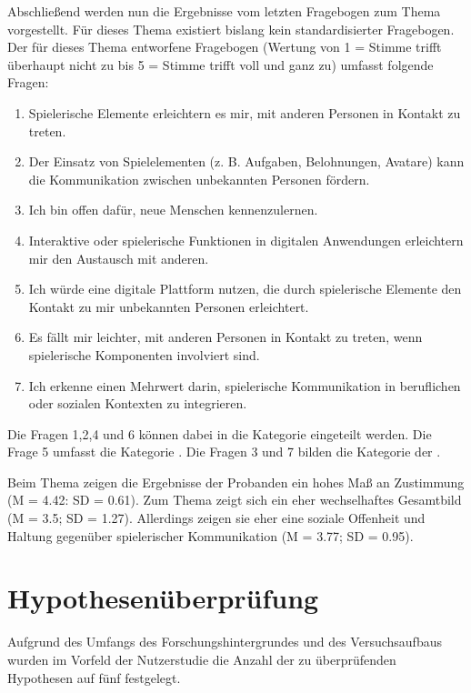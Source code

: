 Abschließend werden nun die Ergebnisse vom letzten Fragebogen zum Thema  vorgestellt. Für dieses Thema existiert bislang kein standardisierter Fragebogen. Der für dieses Thema entworfene Fragebogen (Wertung von 1 = Stimme trifft überhaupt nicht zu bis 5 = Stimme trifft voll und ganz zu) umfasst folgende Fragen:
\begin{enumerate}
    \item Spielerische Elemente erleichtern es mir, mit anderen Personen in Kontakt zu treten.
    \item Der Einsatz von Spielelementen (z. B. Aufgaben, Belohnungen, Avatare) kann die Kommunikation zwischen unbekannten Personen fördern.
    \item Ich bin offen dafür, neue Menschen kennenzulernen.
    \item Interaktive oder spielerische Funktionen in digitalen Anwendungen erleichtern mir den Austausch mit anderen.
    \item Ich würde eine digitale Plattform nutzen, die durch spielerische Elemente den Kontakt zu mir unbekannten Personen erleichtert.
    \item Es fällt mir leichter, mit anderen Personen in Kontakt zu treten, wenn spielerische Komponenten involviert sind.
    \item Ich erkenne einen Mehrwert darin, spielerische Kommunikation in beruflichen oder sozialen Kontexten zu integrieren.
\end{enumerate}

Die Fragen 1,2,4 und 6 können dabei in die Kategorie  eingeteilt werden. Die Frage 5 umfasst die Kategorie . Die Fragen 3 und 7 bilden die Kategorie der .

Beim Thema  zeigen die Ergebnisse der Probanden ein hohes Maß an Zustimmung (M = 4.42: SD = 0.61). Zum Thema  zeigt sich ein eher wechselhaftes Gesamtbild (M = 3.5; SD = 1.27). Allerdings zeigen sie eher eine soziale Offenheit und Haltung gegenüber spielerischer Kommunikation (M = 3.77; SD = 0.95).

\section{Hypothesenüberprüfung}
Aufgrund des Umfangs des Forschungshintergrundes und des Versuchsaufbaus wurden im Vorfeld der Nutzerstudie die Anzahl der zu überprüfenden Hypothesen auf fünf festgelegt.

